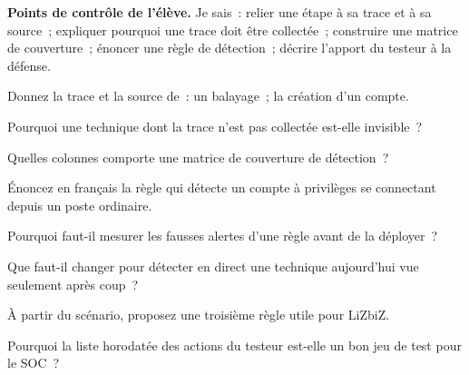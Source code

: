 \begin{boxinfo}
\textbf{Points de contrôle de l'élève.} Je sais~: relier une étape à sa
trace et à sa source~; expliquer pourquoi une trace doit être collectée~;
construire une matrice de couverture~; énoncer une règle de détection~;
décrire l'apport du testeur à la défense.
\end{boxinfo}

\bigskip

\begin{boxexo}[title={\ding{45}\quad Exercice~21.1. Traces \niveaubase}]
Donnez la trace et la source de~: un balayage~; la création d'un compte.
\end{boxexo}

\begin{boxexo}[title={\ding{45}\quad Exercice~21.2. Invisible \niveaubase}]
Pourquoi une technique dont la trace n'est pas collectée est-elle
invisible~?
\end{boxexo}

\begin{boxexo}[title={\ding{45}\quad Exercice~21.3. Matrice \niveaubase}]
Quelles colonnes comporte une matrice de couverture de détection~?
\end{boxexo}

\begin{boxexo}[title={\ding{45}\quad Exercice~21.4. Règle en français \niveaumoyen}]
Énoncez en français la règle qui détecte un compte à privilèges se
connectant depuis un poste ordinaire.
\end{boxexo}

\begin{boxexo}[title={\ding{45}\quad Exercice~21.5. Fausses alertes \niveaumoyen}]
Pourquoi faut-il mesurer les fausses alertes d'une règle avant de la
déployer~?
\end{boxexo}

\begin{boxexo}[title={\ding{45}\quad Exercice~21.6. En direct ou après coup \niveaumoyen}]
Que faut-il changer pour détecter en direct une technique aujourd'hui vue
seulement après coup~?
\end{boxexo}

\begin{boxexo}[title={\ding{45}\quad Exercice~21.7. LOGONE \niveaumoyen}]
À partir du scénario, proposez une troisième règle utile pour LiZbiZ.
\end{boxexo}

\begin{boxexo}[title={\ding{45}\quad Exercice~21.8. Livraison \niveaumoyen}]
Pourquoi la liste horodatée des actions du testeur est-elle un bon jeu de
test pour le SOC~?
\end{boxexo}

